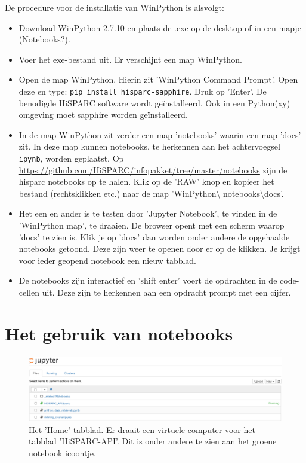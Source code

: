De procedure voor de installatie van WinPython is alsvolgt:
\begin{itemize}
\item Download WinPython 2.7.10 en plaats de .exe op de desktop of in een mapje (Notebooks?).
\item Voer het exe-bestand uit. Er verschijnt een map WinPython.
\item Open de map WinPython. Hierin zit 'WinPython Command Prompt'. Open deze en type:
 {\tt pip install hisparc-sapphire}. Druk op 'Enter'. De benodigde HiSPARC software wordt ge\"{i}nstalleerd.
 Ook in een Python(xy) omgeving moet sapphire worden ge\"{i}nstalleerd.
\item In de map WinPython zit verder een map 'notebooks' waarin een map 'docs' zit. In deze map kunnen notebooks,
te herkennen aan het achtervoegsel {\tt ipynb}, worden geplaatst.
Op \url{https://github.com/HiSPARC/infopakket/tree/master/notebooks} zijn de hisparc notebooks op te halen. Klik
op de 'RAW' knop en kopieer het bestand (rechtsklikken etc.) naar de map 'WinPython\textbackslash
notebooks\textbackslash docs'.
\item Het een en ander is te testen door 'Jupyter Notebook', te vinden in de 'WinPython map', te draaien. De browser
opent met een scherm waarop 'docs' te zien is. Klik je op 'docs' dan worden onder andere de opgehaalde notebooks
getoond. Deze zijn weer te openen door er op de klikken. Je krijgt voor ieder geopend notebook een nieuw tabblad.
\item De notebooks zijn interactief en 'shift enter' voert de opdrachten in de code-cellen uit. Deze zijn te herkennen aan
een opdracht prompt met een cijfer.
\end{itemize}

\section{Het gebruik van notebooks}

\begin{figure}[H]
\includegraphics[width=16cm]{home.png}
\caption{Het 'Home' tabblad. Er draait een virtuele computer voor het tabblad 'HiSPARC-API'. Dit is onder andere te zien
aan het groene notebook icoontje.}
\end{figure}

